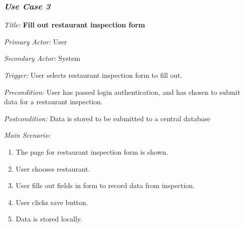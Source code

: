 \documentclass[twoside,letterpaper]{article}
\begin{document}
\subsubsection{\textit{Use Case 3}}

\textit{Title: }{\bfseries\color{black} Fill out restaurant inspection form}

{\color{black} \textit{Primary Actor:} User}

{\color{black} \textit{Secondary Actor:} System}

{\color{black} \textit{Trigger:} User selects restaurant inspection form to fill out.}

{\color{black} \textit{Precondition:} User has passed login authentication, and has chosen to submit data for a restaurant inspection.}

{\color{black} \textit{Postcondition:}  Data is stored to be submitted to a central database}
\newline

{\color{black} \textit{Main Scenario:}}
\begin{enumerate}
\item The page for restaurant inspection form is shown.
\item User chooses restaurant.
\item User fills out fields in form to record data from inspection.
\item User clicks save button.
\item Data is stored locally.
\end{enumerate}
\end{document}

